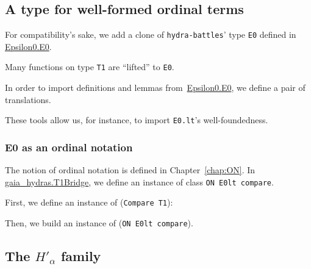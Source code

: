 \subsection{A type for well-formed ordinal terms}
\label{sect:E0-gaia-hydras}
For compatibility's sake, we add a clone of \texttt{hydra-battles}' type \texttt{E0} defined in \href{../theories/html/hydras.Epsilon0.E0.html}{Epsilon0.E0}.


Many functions on type \texttt{T1} are ``lifted'' to \texttt{E0}.



In order to import definitions and lemmas
from~\href{../theories/html/hydras.Epsilon0.E0.html}{Epsilon0.E0}, we define a pair of translations.


These tools allow us, for instance,  to import \texttt{E0.lt}'s  well-foundedness.



\subsubsection{E0 as an ordinal notation}

The notion of ordinal notation is defined in Chapter~\ref{chap:ON}. In \href{../theories/html/gaia_hydras.T1Bridge.html}{gaia\_hydras.T1Bridge}, we define an instance of class \texttt{ON E0lt compare}.

First, we define an instance of (\texttt{Compare T1}):


Then, we build an instance of (\texttt{ON E0lt compare}).





\subsection{The \texorpdfstring{$H'_\alpha$}{H'\_alpha} family}

